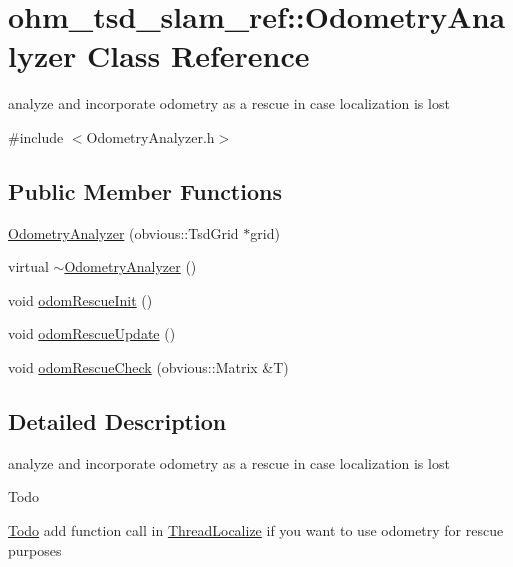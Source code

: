\hypertarget{classohm__tsd__slam__ref_1_1OdometryAnalyzer}{\section{ohm\-\_\-tsd\-\_\-slam\-\_\-ref\-:\-:Odometry\-Analyzer Class Reference}
\label{classohm__tsd__slam__ref_1_1OdometryAnalyzer}
}


analyze and incorporate odometry as a rescue in case localization is lost  




{\ttfamily \#include $<$Odometry\-Analyzer.\-h$>$}

\subsection*{Public Member Functions}
\begin{DoxyCompactItemize}
\item 
\hyperlink{classohm__tsd__slam__ref_1_1OdometryAnalyzer_a32f143dbc8a1a2756f0fad801a4d045c}{Odometry\-Analyzer} (obvious\-::\-Tsd\-Grid $\ast$grid)
\item 
virtual \hyperlink{classohm__tsd__slam__ref_1_1OdometryAnalyzer_a3b20053305dff88a59b1190ddb5d24cb}{$\sim$\-Odometry\-Analyzer} ()
\item 
void \hyperlink{classohm__tsd__slam__ref_1_1OdometryAnalyzer_a9d30f2e79d4c70ee14514ed76322d37a}{odom\-Rescue\-Init} ()
\item 
void \hyperlink{classohm__tsd__slam__ref_1_1OdometryAnalyzer_a0b4ed00f6116e9c60ee570604d90bc5b}{odom\-Rescue\-Update} ()
\item 
void \hyperlink{classohm__tsd__slam__ref_1_1OdometryAnalyzer_ae84beee074e2e89a4af099656efad5ae}{odom\-Rescue\-Check} (obvious\-::\-Matrix \&T)
\end{DoxyCompactItemize}


\subsection{Detailed Description}
analyze and incorporate odometry as a rescue in case localization is lost 

\begin{DoxyRefDesc}{Todo}
\item[\hyperlink{todo__todo000001}{Todo}]add function call in \hyperlink{classohm__tsd__slam__ref_1_1ThreadLocalize}{Thread\-Localize} if you want to use odometry for rescue purposes \end{DoxyRefDesc}


